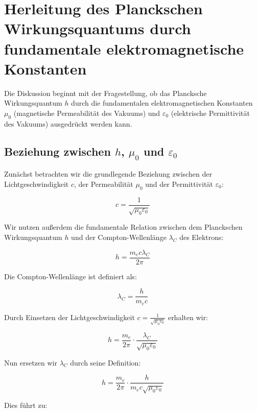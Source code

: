 \documentclass{article}
\begin{document}
\section{Herleitung des Planckschen Wirkungsquantums durch fundamentale elektromagnetische Konstanten}

Die Diskussion beginnt mit der Fragestellung, ob das Plancksche Wirkungsquantum $h$ durch die fundamentalen elektromagnetischen Konstanten $\mu_0$ (magnetische Permeabilität des Vakuums) und $\varepsilon_0$ (elektrische Permittivität des Vakuums) ausgedrückt werden kann.

\subsection{Beziehung zwischen $h$, $\mu_0$ und $\varepsilon_0$}

Zunächst betrachten wir die grundlegende Beziehung zwischen der Lichtgeschwindigkeit $c$, der Permeabilität $\mu_0$ und der Permittivität $\varepsilon_0$:

\begin{equation}
	c = \frac{1}{\sqrt{\mu_0\varepsilon_0}}
\end{equation}

Wir nutzen außerdem die fundamentale Relation zwischen dem Planckschen Wirkungsquantum $h$ und der Compton-Wellenlänge $\lambda_C$ des Elektrons:

\begin{equation}
	h = \frac{m_e c \lambda_C}{2\pi}
\end{equation}

Die Compton-Wellenlänge ist definiert als:

\begin{equation}
	\lambda_C = \frac{h}{m_e c}
\end{equation}

Durch Einsetzen der Lichtgeschwindigkeit $c = \frac{1}{\sqrt{\mu_0\varepsilon_0}}$ erhalten wir:

\begin{equation}
	h = \frac{m_e}{2\pi} \cdot \frac{\lambda_C}{\sqrt{\mu_0\varepsilon_0}}
\end{equation}

Nun ersetzen wir $\lambda_C$ durch seine Definition:

\begin{equation}
	h = \frac{m_e}{2\pi} \cdot \frac{h}{m_e c \sqrt{\mu_0\varepsilon_0}}
\end{equation}

Dies führt zu:
\end{document}
